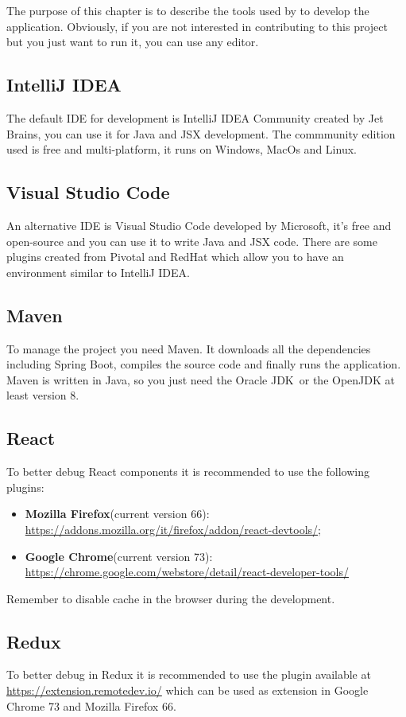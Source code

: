 The purpose of this chapter is to describe the tools used by \gruppo{} to develop the application.
Obviously, if you are not interested in contributing to this project but you just want to run it, you can use any editor.
\subsection{IntelliJ IDEA}
The default IDE for development is IntelliJ IDEA Community created by Jet Brains, you can use it for Java and JSX development. The commmunity edition used is free and multi-platform, it runs on Windows, MacOs and Linux.

\subsection{Visual Studio Code}
An alternative IDE is Visual Studio Code developed by Microsoft, it's free and open-source and you can use it to write Java and JSX code. There are some plugins created from Pivotal and RedHat which allow you to have an environment similar to IntelliJ IDEA.

\subsection{Maven}
To manage the project you need Maven. It downloads all the dependencies including Spring Boot, compiles the source code and finally runs the application. Maven is written in Java, so you just need the {Oracle JDK}\ or the OpenJDK at least version 8.

\subsection{React}
To better debug React components it is recommended to use the following plugins:
\begin{itemize}
\item \textbf{Mozilla Firefox}(current version 66): \\
\url{https://addons.mozilla.org/it/firefox/addon/react-devtools/};
\item \textbf{Google Chrome}(current version 73): \\
\href{https://chrome.google.com/webstore/detail/react-developer-tools/fmkadmapgofadopljbjfkapdkoienihi}{https://chrome.google.com/webstore/detail/react-developer-tools/}
\end{itemize}
Remember to disable cache in the browser during the development.

\subsection{Redux}
To better debug in Redux it is recommended to use the plugin available at \url{https://extension.remotedev.io/} which can be used as extension in Google Chrome 73 and Mozilla Firefox 66.

 
